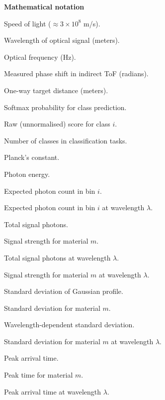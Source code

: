 \documentclass[12pt,a4paper,oneside]{report}
\begin{document}
{\fontsize{12pt}{18pt}\selectfont
{\fontsize{14pt}{21pt}\selectfont\textbf{Mathematical notation}}

\vspace{0.5cm}

{\setlength{\parindent}{0pt}%
\begin{description}[leftmargin=1.8cm, style=nextline, itemsep=4pt]
    \item[$c$] Speed of light ($\approx 3\times10^{8}$ m/s).
    \item[$\lambda$] Wavelength of optical signal (meters).
    \item[$\nu$] Optical frequency (Hz).
    \item[$\varphi$] Measured phase shift in indirect ToF (radians).
    \item[$d_{\text{target}}$] One-way target distance (meters).
    \item[$p_{\text{class}}$] Softmax probability for class prediction.
    \item[$\text{logit}_{i}$] Raw (unnormalised) score for class $i$.
    \item[$K_c$] Number of classes in classification tasks.
    \item[$h$] Planck's constant.
    \item[$E$] Photon energy.
    \item[$\mu_i$] Expected photon count in bin $i$.
    \item[$\mu_{i,\lambda}$] Expected photon count in bin $i$ at wavelength $\lambda$.
    \item[$S$] Total signal photons.
    \item[$S_m$] Signal strength for material $m$.
    \item[$S_\lambda$] Total signal photons at wavelength $\lambda$.
    \item[$S_{m,\lambda}$] Signal strength for material $m$ at wavelength $\lambda$.
    \item[$\sigma$] Standard deviation of Gaussian profile.
    \item[$\sigma_m$] Standard deviation for material $m$.
    \item[$\sigma_\lambda$] Wavelength-dependent standard deviation.
    \item[$\sigma_{m,\lambda}$] Standard deviation for material $m$ at wavelength $\lambda$.
    \item[$t_0$] Peak arrival time.
    \item[$t_{0,m}$] Peak time for material $m$.
    \item[$t_{0,\lambda}$] Peak arrival time at wavelength $\lambda$.

\end{description}}}
\end{document}
